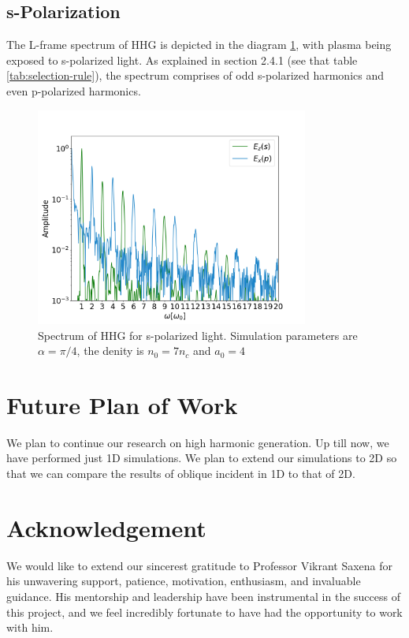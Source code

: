 \documentclass[12pt]{article}
\begin{document}
\subsection{s-Polarization}
The L-frame spectrum of HHG is depicted in the diagram \ref{fig:s-fft}, with plasma being exposed to s-polarized light. As explained in section 2.4.1 (see that table \ref{tab:selection-rule}), the spectrum comprises of odd s-polarized harmonics and even p-polarized harmonics.
\begin{figure}[h]
    \centering
    \includegraphics[width=0.8\textwidth]{images/s_fft.png}
    \caption{Spectrum of HHG for s-polarized light. Simulation parameters are $\alpha = \pi/4$, the denity is $n_0 = 7n_c$ and $a_0 = 4$}
    \label{fig:s-fft}
\end{figure}

\section{Future Plan of Work}
We plan to continue our research on high harmonic generation. Up till now, we have performed just 1D simulations. We plan to extend our simulations to 2D so that we can compare the results of oblique incident in 1D to that of 2D.

\section{Acknowledgement}
We would like to extend our sincerest gratitude to Professor Vikrant Saxena for his unwavering support, patience, motivation, enthusiasm, and invaluable guidance. His mentorship and leadership have been instrumental in the success of this project, and we feel incredibly fortunate to have had the opportunity to work with him.
\printbibliography
\end{document}
